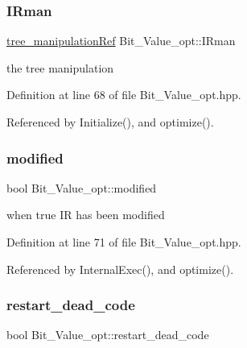 \subsubsection{\texorpdfstring{I\+Rman}{IRman}}
{\footnotesize\ttfamily \hyperlink{tree__manipulation_8hpp_a1a9460e3a2f9fc6a96cfd2f24cc9b2a5}{tree\+\_\+manipulation\+Ref} Bit\+\_\+\+Value\+\_\+opt\+::\+I\+Rman\hspace{0.3cm}{\ttfamily [private]}}



the tree manipulation 



Definition at line 68 of file Bit\+\_\+\+Value\+\_\+opt.\+hpp.



Referenced by Initialize(), and optimize().

\mbox{\label{classBit__Value__opt_aa0f0fd2440aa4867f3a0b942e2715181}} 
\subsubsection{\texorpdfstring{modified}{modified}}
{\footnotesize\ttfamily bool Bit\+\_\+\+Value\+\_\+opt\+::modified\hspace{0.3cm}{\ttfamily [private]}}



when true IR has been modified 



Definition at line 71 of file Bit\+\_\+\+Value\+\_\+opt.\+hpp.



Referenced by Internal\+Exec(), and optimize().

\mbox{\label{classBit__Value__opt_a4ffaa5b4e46c2e2848bfde026f753046}} 
\subsubsection{\texorpdfstring{restart\+\_\+dead\+\_\+code}{restart\_dead\_code}}
{\footnotesize\ttfamily bool Bit\+\_\+\+Value\+\_\+opt\+::restart\+\_\+dead\+\_\+code\hspace{0.3cm}{\ttfamily [private]}}



